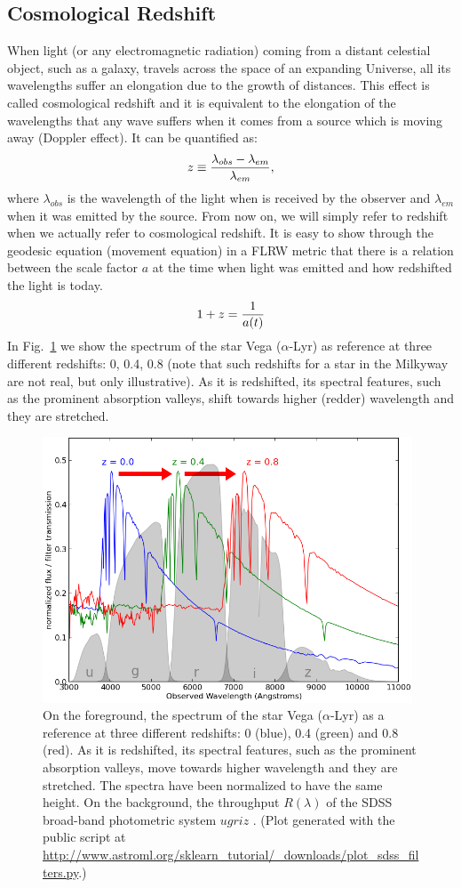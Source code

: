 \subsection{Cosmological Redshift}
When light (or any electromagnetic radiation) coming from a distant celestial object, such as a galaxy, travels across the space of an expanding Universe, all its wavelengths suffer an elongation due to the growth of distances. This effect is called cosmological redshift and it is equivalent to the elongation of the wavelengths that any wave suffers when it comes from a source which is moving away (Doppler effect). It can be quantified as: 
\begin{equation}
z \equiv {\lambda_{obs} - \lambda_{em} \over \lambda_{em}},
\label{redshift}
\end{equation} 
where $\lambda_{obs}$ is the wavelength of the light when is received by the observer and $\lambda_{em}$ when it was emitted by the source. From now on, we will simply refer to redshift when we actually refer to cosmological redshift. It is easy to show through the geodesic equation (movement equation) in a FLRW metric that there is a relation between the scale factor $a$ at the time when light was emitted and how redshifted the light is today. 
\begin{equation}
1 + z = {1 \over a(t)}
\label{z2a}
\end{equation} 
In Fig.~\ref{fig:sdss_filt} we show the spectrum of the star Vega ($\alpha$-Lyr) as reference at three different redshifts: 0, 0.4, 0.8 (note that such redshifts for a star in the Milkyway are not real, but only illustrative). As it is redshifted, its spectral features, such as the prominent absorption valleys, shift towards higher (redder) wavelength and they are stretched.
\begin{figure}
\centering
\includegraphics[width=110mm]{./plots/plot_sdss_filters.png}
\caption{On the foreground, the spectrum of the star Vega ($\alpha$-Lyr) as a reference at three different redshifts: 0 (blue), 0.4 (green) and 0.8 (red). As it is redshifted, its spectral features, such as the prominent absorption valleys, move towards higher wavelength and they are stretched. The spectra have been normalized to have the same height. On the background, the throughput $R(\lambda)$ of the SDSS broad-band photometric system $ugriz$ \citep{Fukugita1996}. (Plot generated with the public script at \url{http://www.astroml.org/sklearn_tutorial/_downloads/plot_sdss_filters.py}.)}
\label{fig:sdss_filt}
\end{figure}

